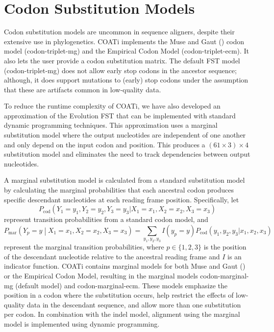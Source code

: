 \section*{Codon Substitution Models}

Codon substitution models are uncommon in sequence aligners, despite their extensive use in phylogenetics.
COATi implements the Muse and Gaut (\citeyear{muse_gaut_1994}) codon model (codon-triplet-mg) and the Empirical Codon Model  (codon-triplet-ecm).
It also lets the user provide a codon substitution matrix.
The default FST model (codon-triplet-mg) does not allow early stop codons in the ancestor sequence; although, it does support mutations to (early) stop codons under the assumption that these are artifacts common in low-quality data.

To reduce the runtime complexity of COATi, we have also developed an approximation of the Evolution FST that can be implemented with standard dynamic programming techniques. This approximation uses a marginal substitution model where the output nucleotides are independent of one another and only depend on the input codon and position. This produces a $\left(61 \times 3 \right) \times 4$ substitution model and eliminates the need to track dependencies between output nucleotides.

A marginal substitution model is calculated from a standard substitution model by calculating the marginal probabilities that each ancestral codon produces specific descendant nucleotides at each reading frame position.
%
Specifically, let
\[
P_\text{cod}\left( Y_1 = y_1, Y_2 = y_2, Y_3 = y_3 |
                   X_1 = x_1, X_2 = x_2, X_3 = x_3 \right)
\]
represent transition probabilities from a standard codon model, and
%
\[
P_\text{mar}\left(Y_p = y \middle| X_1 = x_1, X_2 = x_2, X_3 = x_3 \right)
=
\sum_{y_1, y_2, y_3} I(y_p = y)
P_\text{cod}\left( y_1, y_2, y_3 |
                   x_1, x_2, x_3 \right)
\]
%
represent the marginal transition probabilities, where
$p \in \{1, 2, 3\}$ is the position of the descendant nucleotide relative to the ancestral reading frame and $I$ is an indicator function.
COATi contains marginal models for both Muse and Gaut (\citeyear{muse_gaut_1994}) or the Empirical Codon Model, resulting in the marginal models codon-marginal-mg (default model) and codon-marginal-ecm.
These models emphasize the position in a codon where the substitution occurs, help restrict the effects of low-quality data in the descendant sequence, and allow more than one substitution per codon.
In combination with the indel model, alignment using the marginal model is implemented using dynamic programming.

